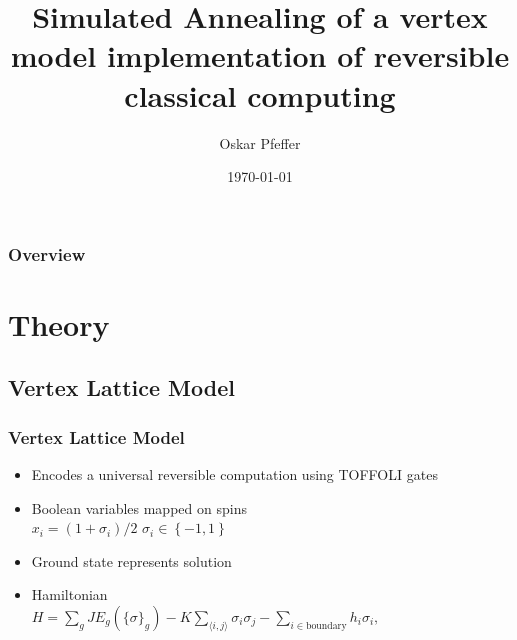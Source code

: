 \documentclass{beamer}
\title[SA of a vertex model implementation of reversible classical computing ]{Simulated Annealing of a vertex model implementation of reversible classical computing} %
\author{Oskar Pfeffer} %
\institute[TUD - BU] %
{
Technische Universit\"at Dresden / Boston University\\ %
\medskip
\textit{oskar.pfeffer@gmail.com} %
}
\date{\today} %
\begin{document}
\begin{frame}
\titlepage %
\end{frame}

\begin{frame}
\frametitle{Overview} %
\tableofcontents %
\end{frame}


\section{Theory} %

\subsection{Vertex Lattice Model} %
\begin{frame}
  \frametitle{Vertex Lattice Model}
  \begin{itemize}
    \item Encodes a universal reversible computation using TOFFOLI gates
    \item Boolean variables mapped on spins \\
        $x_i = \left( 1 + \sigma_i \right)/2$ \; \; \;
        $\sigma_i \in \left \{ -1,1 \right \}$
    \item Ground state represents solution
    \item Hamiltonian \\
    $H = \sum_g J E_g \left( \{ \sigma \} _g \right) - K \sum _{\langle i, j \rangle} \sigma_i \sigma_j - \sum_{i\in \text{boundary}} h_i \sigma_i \text{,}$
  \end{itemize}
\end{frame}
\end{document}

